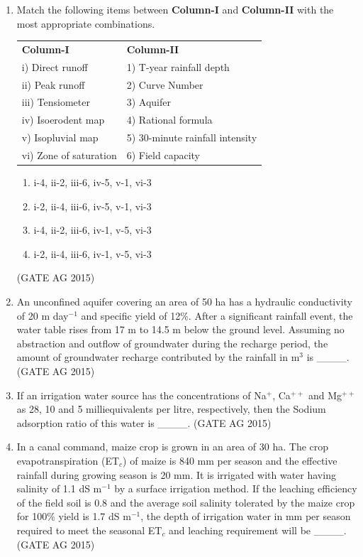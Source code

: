\documentclass[journal,12pt,onecolumn]{IEEEtran}
\theoremstyle{remark}
\begin{document}
\begin{enumerate}
\item 
Match the following items between \textbf{Column-I} and \textbf{Column-II} with the most appropriate combinations.

\begin{center}
\begin{tabular}{ll}
\textbf{Column-I} & \textbf{Column-II} \\
i) Direct runoff & 1) T-year rainfall depth \\
ii) Peak runoff & 2) Curve Number \\
iii) Tensiometer & 3) Aquifer \\
iv) Isoerodent map & 4) Rational formula \\
v) Isopluvial map & 5) 30-minute rainfall intensity \\
vi) Zone of saturation & 6) Field capacity \\
\end{tabular}
\end{center}
\begin{multicols}{2}
\begin{enumerate}
    \item i-4, ii-2, iii-6, iv-5, v-1, vi-3
    \item i-2, ii-4, iii-6, iv-5, v-1, vi-3
    \item i-4, ii-2, iii-6, iv-1, v-5, vi-3
    \item i-2, ii-4, iii-6, iv-1, v-5, vi-3
\end{enumerate}
\end{multicols}
\hfill{(GATE AG 2015)}

\item 
An unconfined aquifer covering an area of 50 ha has a hydraulic conductivity of 20 m day$^{-1}$ and specific yield of 12\%. After a significant rainfall event, the water table rises from 17 m to 14.5 m below the ground level. Assuming no abstraction and outflow of groundwater during the recharge period, the amount of groundwater recharge contributed by the rainfall in m$^{3}$ is \_\_\_\_.
\hfill{(GATE AG 2015)}

\item 
If an irrigation water source has the concentrations of Na$^{+}$, Ca$^{++}$ and Mg$^{++}$ as 28, 10 and 5 milliequivalents per litre, respectively, then the Sodium adsorption ratio of this water is \_\_\_\_.
\hfill{(GATE AG 2015)}

\item  
In a canal command, maize crop is grown in an area of 30 ha. The crop evapotranspiration (ET$_c$) of maize is 840 mm per season and the effective rainfall during growing season is 20 mm. It is irrigated with water having salinity of 1.1 dS m$^{-1}$ by a surface irrigation method. If the leaching efficiency of the field soil is 0.8 and the average soil salinity tolerated by the maize crop for 100\% yield is 1.7 dS m$^{-1}$, the depth of irrigation water in mm per season required to meet the seasonal ET$_c$ and leaching requirement will be \_\_\_\_.
\hfill{(GATE AG 2015)}


\end{enumerate}
\end{document}
